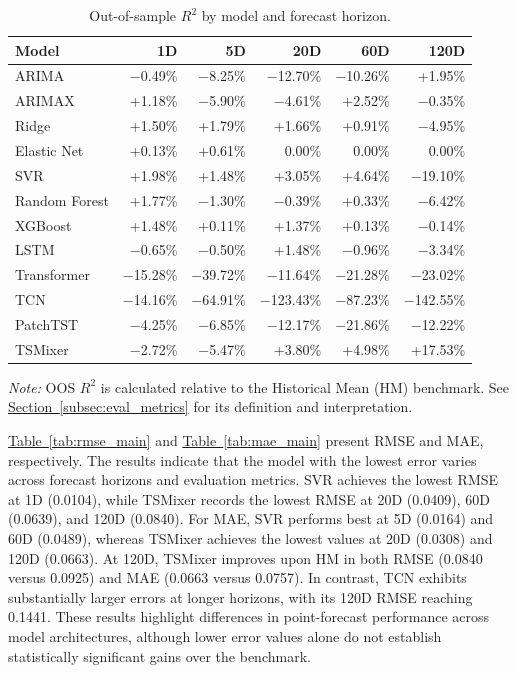 \documentclass[runningheads,orivec]{llncs}
\begin{document}
\begin{table}[htbp]
\centering
\caption{Out-of-sample $R^2$ by model and forecast horizon.}\label{tab:oos_r2_main}
\setlength{\tabcolsep}{4.5pt}
\begin{tabular}{lrrrrr}
\hline
Model & 1D & 5D & 20D & 60D & 120D \\
\hline
ARIMA & $-$0.49\% & $-$8.25\% & $-$12.70\% & $-$10.26\% & +1.95\% \\
ARIMAX & +1.18\% & $-$5.90\% & $-$4.61\% & +2.52\% & $-$0.35\% \\
Ridge & +1.50\% & +1.79\% & +1.66\% & +0.91\% & $-$4.95\% \\
Elastic Net & +0.13\% & +0.61\% & 0.00\% & 0.00\% & 0.00\% \\
SVR & +1.98\% & +1.48\% & +3.05\% & +4.64\% & $-$19.10\% \\
Random Forest & +1.77\% & $-$1.30\% & $-$0.39\% & +0.33\% & $-$6.42\% \\
XGBoost & +1.48\% & +0.11\% & +1.37\% & +0.13\% & $-$0.14\% \\
LSTM & $-$0.65\% & $-$0.50\% & +1.48\% & $-$0.96\% & $-$3.34\% \\
Transformer & $-$15.28\% & $-$39.72\% & $-$11.64\% & $-$21.28\% & $-$23.02\% \\
TCN & $-$14.16\% & $-$64.91\% & $-$123.43\% & $-$87.23\% & $-$142.55\% \\
PatchTST & $-$4.25\% & $-$6.85\% & $-$12.17\% & $-$21.86\% & $-$12.22\% \\
TSMixer & $-$2.72\% & $-$5.47\% & +3.80\% & +4.98\% & +17.53\% \\
\hline
\end{tabular}
\par\vspace{4pt}\parbox{0.85\linewidth}{\footnotesize\textit{Note:} OOS $R^2$ is calculated relative to the Historical Mean (HM) benchmark. See \hyperref[subsec:eval_metrics]{Section~\ref*{subsec:eval_metrics}} for its definition and interpretation.}
\end{table}

\hyperref[tab:rmse_main]{Table~\ref*{tab:rmse_main}} and \hyperref[tab:mae_main]{Table~\ref*{tab:mae_main}} present RMSE and MAE, respectively. The results indicate that the model with the lowest error varies across forecast horizons and evaluation metrics. SVR achieves the lowest RMSE at 1D (0.0104), while TSMixer records the lowest RMSE at 20D (0.0409), 60D (0.0639), and 120D (0.0840). For MAE, SVR performs best at 5D (0.0164) and 60D (0.0489), whereas TSMixer achieves the lowest values at 20D (0.0308) and 120D (0.0663). At 120D, TSMixer improves upon HM in both RMSE (0.0840 versus 0.0925) and MAE (0.0663 versus 0.0757). In contrast, TCN exhibits substantially larger errors at longer horizons, with its 120D RMSE reaching 0.1441. These results highlight differences in point-forecast performance across model architectures, although lower error values alone do not establish statistically significant gains over the benchmark.
\end{document}

